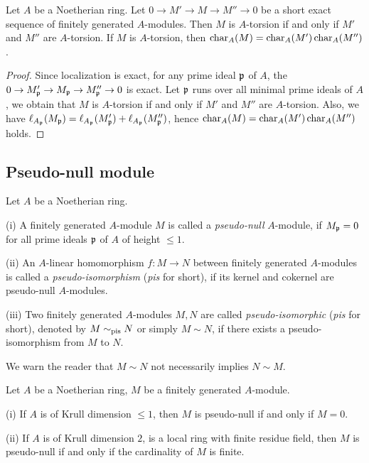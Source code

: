 \begin{prop}
\label{char-ideal-additive}
Let $A$ be a Noetherian ring.
Let $0\to M'\to M\to M''\to 0$ be a short exact sequence of finitely generated $A$-modules. Then $M$ is $A$-torsion if and only if $M'$ and $M''$ are $A$-torsion.
If $M$ is $A$-torsion, then $\operatorname{char}_A(M)=\operatorname{char}_A(M')\operatorname{char}_A(M'')$.
\end{prop}

\begin{proof}
Since localization is exact, for any prime ideal ${\mathfrak{p}}$ of $A$,
the $0\to M_{\mathfrak{p}}'\to M_{\mathfrak{p}}\to M_{\mathfrak{p}}''\to 0$ is exact.
Let ${\mathfrak{p}}$ runs over all minimal prime ideals of $A$,
we obtain that $M$ is $A$-torsion if and only if $M'$ and $M''$ are $A$-torsion.
Also, we have $\ell_{A_{\mathfrak{p}}}(M_{\mathfrak{p}})=\ell_{A_{\mathfrak{p}}}(M_{\mathfrak{p}}')+\ell_{A_{\mathfrak{p}}}(M_{\mathfrak{p}}'')$,
hence $\operatorname{char}_A(M)=\operatorname{char}_A(M')\operatorname{char}_A(M'')$ holds.
\end{proof}

\subsection{Pseudo-null module}

\begin{definition}
\label{pseudo-null}
\leanok
Let $A$ be a Noetherian ring.

{\rm(i)}
A finitely generated $A$-module $M$ is called a \emph{pseudo-null} $A$-module,
if $M_{\mathfrak{p}}=0$ for all prime ideals ${\mathfrak{p}}$ of $A$ of height $\leq 1$.

{\rm(ii)}
An $A$-linear homomorphism $f:M\to N$ between finitely generated $A$-modules
is called a \emph{pseudo-isomorphism} (\emph{pis} for short),
if its kernel and cokernel are pseudo-null $A$-modules.

{\rm(iii)}
Two finitely generated $A$-modules $M,N$ are called
\emph{pseudo-isomorphic} (\emph{pis} for short),
denoted by $M\sim_{\mathrm{pis}} N$ or simply $M\sim N$,
if there exists a pseudo-isomorphism from $M$ to $N$.
\end{definition}

\begin{remark}
We warn the reader that $M\sim N$ not necessarily implies $N\sim M$.
\end{remark}

\begin{prop}
\label{pseudo-null-criterion}
Let $A$ be a Noetherian ring, $M$ be a finitely generated $A$-module.

{\rm(i)} If $A$ is of Krull dimension $\leq 1$, then $M$ is pseudo-null
if and only if $M=0$.

{\rm(ii)} If $A$ is of Krull dimension $2$,
is a local ring with finite residue field, then $M$ is pseudo-null
if and only if the cardinality of $M$ is finite.
\end{prop}

